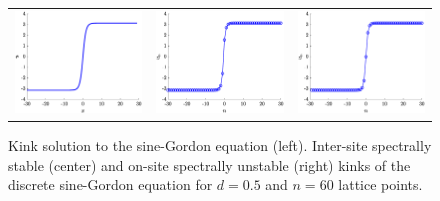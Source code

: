 \documentclass[12pt,reqno]{amsart}
\begin{document}
\begin{figure}[H]
	\begin{center}
	\begin{tabular}{ccc}
	\includegraphics[width=5cm]{contSGkink.eps}	&
	\includegraphics[width=5cm]{1kinkintersite.eps} &
	\includegraphics[width=5cm]{1kinkonsite.eps}
	\end{tabular}
	\end{center}
	\caption{Kink solution to the sine-Gordon equation (left). Inter-site spectrally stable (center) and on-site 
	spectrally unstable (right) kinks of the discrete sine-Gordon equation for $d = 0.5$ and $n=60$ lattice points. }
	\label{fig:SGkinks}
\end{figure}
\end{document}
